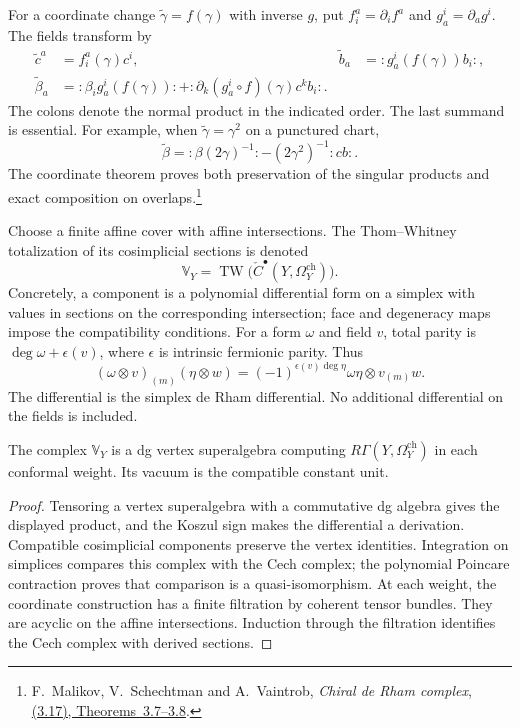 For a coordinate change \(\widetilde\gamma=f(\gamma)\) with
inverse \(g\), put \(f_i^a=\partial_i f^a\) and
\(g_a^i=\partial_a g^i\).  The fields transform by
\begin{align*}
 \widetilde c^a&=f_i^a(\gamma)c^i,&
 \widetilde b_a&=:g_a^i(f(\gamma))b_i:,\\
 \widetilde\beta_a
 &=:\beta_i g_a^i(f(\gamma)):
   +:\partial_k(g_a^i\circ f)(\gamma)c^k b_i:.
\end{align*}
The colons denote the normal product in the indicated order.
The last summand is essential.  For example, when
\(\widetilde\gamma=\gamma^2\) on a punctured chart,
\[
 \widetilde\beta=:\beta(2\gamma)^{-1}:
                   -(2\gamma^2)^{-1}:cb:.
\]
The coordinate theorem proves both preservation of the singular
products and exact composition on overlaps.\footnote{
F.~Malikov, V.~Schechtman and A.~Vaintrob, \emph{Chiral de Rham
complex}, \href{https://arxiv.org/abs/math/9803041}{(3.17),
Theorems~3.7--3.8}.}

Choose a finite affine cover with affine intersections.  The
Thom--Whitney totalization of its cosimplicial sections is denoted
\[
 \mathbb V_Y=\operatorname{TW}
       \bigl(\check C^\bullet(Y,\Omega_Y^{\mathrm{ch}})\bigr).
\]
Concretely, a component is a polynomial differential form on a
simplex with values in sections on the corresponding intersection;
face and degeneracy maps impose the compatibility conditions.
For a form \(\omega\) and field \(v\), total parity is
\(\deg\omega+\epsilon(v)\), where \(\epsilon\) is intrinsic
fermionic parity.  Thus
\[
 (\omega\otimes v)_{(m)}(\eta\otimes w)
 =(-1)^{\epsilon(v)\deg\eta}\omega\eta\otimes v_{(m)}w.
\]
The differential is the simplex de Rham differential.  No
additional differential on the fields is included.

\begin{proposition}\label{prop:zbps-derived-field-seed}
The complex \(\mathbb V_Y\) is a dg vertex superalgebra computing
\(R\Gamma(Y,\Omega_Y^{\mathrm{ch}})\) in each conformal weight.
Its vacuum is the compatible constant unit.
\end{proposition}
\begin{proof}
Tensoring a vertex superalgebra with a commutative dg algebra gives
the displayed product, and the Koszul sign makes the differential
a derivation.  Compatible cosimplicial components preserve the
vertex identities.  Integration on simplices compares this
complex with the Cech complex; the polynomial Poincare contraction
proves that comparison is a quasi-isomorphism.  At each weight,
the coordinate construction has a finite filtration by coherent
tensor bundles.  They are acyclic on the affine intersections.
Induction through the filtration identifies the Cech complex
with derived sections.
\end{proof}

